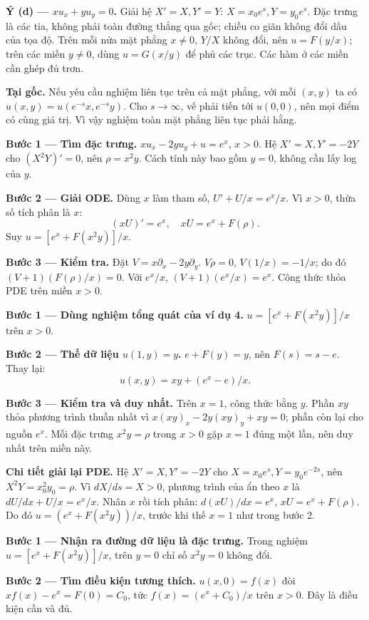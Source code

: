 \textbf{Ý (d) — $xu_x+yu_y=0$.} Giải hệ $X'=X,Y'=Y$: $X=x_0e^s,Y=y_0e^s$. Đặc trưng là các tia, không phải toàn đường thẳng qua gốc; chiều co giãn không đổi dấu của tọa độ. Trên mỗi nửa mặt phẳng $x\ne0$, $Y/X$ không đổi, nên $u=F(y/x)$; trên các miền $y\ne0$, dùng $u=G(x/y)$ để phủ các trục. Các hàm ở các miền cần ghép đủ trơn.

\textbf{Tại gốc.} Nếu yêu cầu nghiệm liên tục trên cả mặt phẳng, với mỗi $(x,y)$ ta có $u(x,y)=u(e^{-s}x,e^{-s}y)$. Cho $s\to\infty$, vế phải tiến tới $u(0,0)$, nên mọi điểm có cùng giá trị. Vì vậy nghiệm toàn mặt phẳng liên tục phải hằng.

\textbf{Bước 1 — Tìm đặc trưng.} $xu_x-2yu_y+u=e^x$, $x>0$. Hệ $X'=X,Y'=-2Y$ cho $(X^2Y)'=0$, nên $\rho=x^2y$. Cách tính này bao gồm $y=0$, không cần lấy log của $y$.

\textbf{Bước 2 — Giải ODE.} Dùng $x$ làm tham số, $U'+U/x=e^x/x$. Vì $x>0$, thừa số tích phân là $x$:
\[(xU)'=e^x,\quad xU=e^x+F(\rho).\]
Suy $u=[e^x+F(x^2y)]/x$.

\textbf{Bước 3 — Kiểm tra.} Đặt $V=x\partial_x-2y\partial_y$. $V\rho=0$, $V(1/x)=-1/x$; do đó $(V+1)(F(\rho)/x)=0$. Với $e^x/x$, $(V+1)(e^x/x)=e^x$. Công thức thỏa PDE trên miền $x>0$.

\textbf{Bước 1 — Dùng nghiệm tổng quát của ví dụ 4.} $u=[e^x+F(x^2y)]/x$ trên $x>0$.

\textbf{Bước 2 — Thế dữ liệu $u(1,y)=y$.} $e+F(y)=y$, nên $F(s)=s-e$. Thay lại:
\[u(x,y)=xy+(e^x-e)/x.\]

\textbf{Bước 3 — Kiểm tra và duy nhất.} Trên $x=1$, công thức bằng $y$. Phần $xy$ thỏa phương trình thuần nhất vì $x(xy)_x-2y(xy)_y+xy=0$; phần còn lại cho nguồn $e^x$. Mỗi đặc trưng $x^2y=\rho$ trong $x>0$ gặp $x=1$ đúng một lần, nên duy nhất trên miền này.

\textbf{Chi tiết giải lại PDE.} Hệ $X'=X,Y'=-2Y$ cho $X=x_0e^s,Y=y_0e^{-2s}$, nên $X^2Y=x_0^2y_0=\rho$. Vì $dX/ds=X>0$, phương trình của ẩn theo $x$ là $dU/dx+U/x=e^x/x$. Nhân $x$ rồi tích phân: $d(xU)/dx=e^x$, $xU=e^x+F(\rho)$. Do đó $u=(e^x+F(x^2y))/x$, trước khi thế $x=1$ như trong bước 2.

\textbf{Bước 1 — Nhận ra đường dữ liệu là đặc trưng.} Trong nghiệm $u=[e^x+F(x^2y)]/x$, trên $y=0$ chỉ số $x^2y=0$ không đổi.

\textbf{Bước 2 — Tìm điều kiện tương thích.} $u(x,0)=f(x)$ đòi $xf(x)-e^x=F(0)=C_0$, tức $f(x)=(e^x+C_0)/x$ trên $x>0$. Đây là điều kiện cần và đủ.

